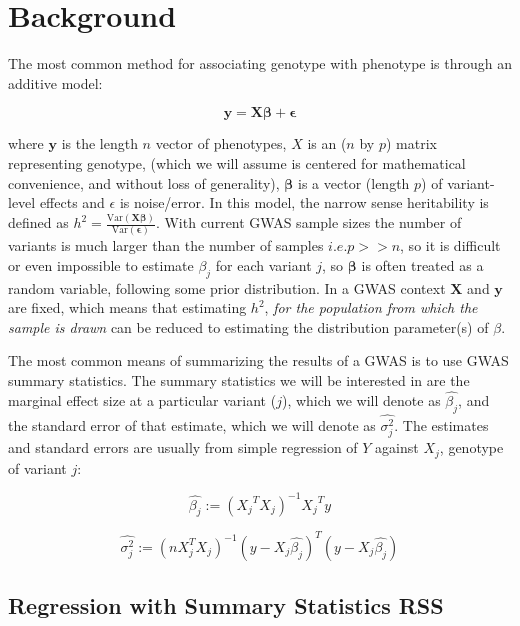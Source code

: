 \section{Background}

The most common method for associating genotype with phenotype is through  an additive model:

$$ \textbf{y}= \textbf{X} \boldsymbol{\beta} + \boldsymbol{\epsilon}$$

where $\textbf{y}$ is the length $n$ vector of phenotypes, \(X\) is an (\(n\) by \(p\)) matrix representing genotype, (which we will assume is centered for mathematical convenience, and without loss of generality), \(\boldsymbol{\beta}\) is a vector (length \(p\)) of variant-level effects and \(\epsilon\) is noise/error. In this model, the narrow sense heritability is defined as $h^2=\frac{\text{Var}(\textbf{X}\boldsymbol{\beta})}{\text{Var}(\boldsymbol{\epsilon})}$. With current GWAS sample sizes the number of variants is much larger than the number of samples \(i.e. p >>n\), so it is difficult or even impossible to estimate $\beta_j$ for each variant $j$, so $\boldsymbol{\beta}$ is often treated as a random variable, following some prior distribution. %
In a GWAS context $\textbf{X}$ and $\textbf{y}$ are fixed, which means that estimating $h^2$, \emph{for the population from which the sample is drawn} can be reduced to estimating the distribution parameter(s) of $\beta$. %

The most common means of summarizing the results of a GWAS is to use GWAS summary statistics.
The summary statistics we will be interested in are the marginal effect size at a particular variant (\(j\)), which we will denote as
\(\hat{\beta_j}\), and the standard error of that estimate, which we will denote as \(\hat{\sigma_j^2}\). The estimates and standard errors are usually from simple regression of $Y$ against $X_j$, genotype of variant $j$: 

$$ \hat{\beta_j} := {({X_j}^{T}X_j)}^{-1}{X_j}^{T}y $$

$$ \hat{\sigma_j^2} := (nX_j^TX_j)^{-1}(y-X_j\hat{\beta_j})^T(y-X_j\hat{\beta_j}) $$


\subsection{Regression with Summary Statistics RSS}\label{sec:orgb0b15e2}

